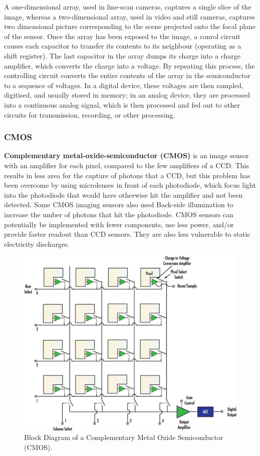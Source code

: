 \documentclass[10pt]{article}
\begin{document}
\begin{multicols}{2}
A one-dimensional array, used in line-scan cameras, captures a single slice of the image, whereas a two-dimensional array, used in video and still cameras, captures two dimensional picture corresponding to the scene projected onto the focal plane of the sensor.
Once the array has been exposed to the image, a conrol circuit causes each capacitor to transfer its contents to its neighbour (operating as a shift register). The last capacitor in the array dumps its charge into a charge amplifier, which converts the charge into a voltage.
By repeating this process, the controlling circuit converts the entire contents of the array  in the semiconductor to a sequence of voltages. In a digital device, these voltages are then sampled, digitised, and usually stored in memory; in an analog device, they are processed into a continuous analog signal, which is then processed and fed out to other circuits for transmission, recording, or other processing.

\subsubsection{CMOS}
\textbf{Complementary metal-oxide-semiconductor (CMOS)} is an image sensor with an amplifier for each pixel, compared to the few amplifiers of a CCD. This results in less area for the capture of photons that a CCD, but this problem has been overcome by using microlenses in front of each photodiode, which focus light into the photodiode that would have otherwise hit the amplifier and not been detected. Some CMOS imaging sensors also used Back-side illumination to increase the umber of photons that hit the photodiode.
CMOS sensors can potentially be implemented with fewer components, use less power, and/or provide faster readout than CCD sensors. They are also less vulnerable to static electricity discharges.
\begin{figure}[H]
    \centering
    \includegraphics[width=1\linewidth]{Images/Week 2/cmos-schematic.png}
    \caption{Block Diagram of a Complementary Metal Oxide Semiconductor (CMOS).}
\end{figure}

\end{multicols}
\end{document}
